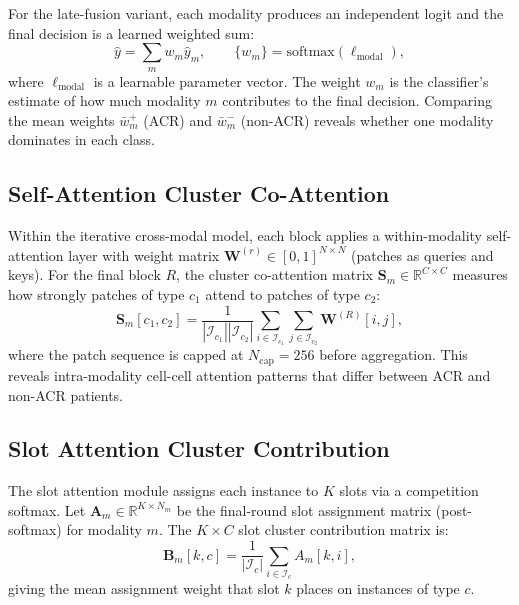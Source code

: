 \documentclass[11pt,a4paper]{article}
\begin{document}
For the late-fusion variant, each modality produces an independent logit and
the final decision is a learned weighted sum:
\begin{equation}
    \hat{y} = \sum_{m} w_m \hat{y}_m,
    \qquad \{w_m\} = \text{softmax}(\boldsymbol{\ell}_\text{modal}),
\end{equation}
where $\boldsymbol{\ell}_\text{modal}$ is a learnable parameter vector.
The weight $w_m$ is the classifier's estimate of how much modality $m$
contributes to the final decision.
Comparing the mean weights $\bar{w}_m^{+}$ (ACR) and $\bar{w}_m^{-}$ (non-ACR)
reveals whether one modality dominates in each class.

\subsection{Self-Attention Cluster Co-Attention}

Within the iterative cross-modal model, each block applies a within-modality
self-attention layer with weight matrix
$\mathbf{W}^{(r)} \in [0,1]^{N\times N}$ (patches as queries and keys).
For the final block $R$, the cluster co-attention matrix
$\mathbf{S}_m \in \mathbb{R}^{C\times C}$ measures how strongly patches of
type $c_1$ attend to patches of type $c_2$:
\begin{equation}
    \mathbf{S}_m[c_1, c_2]
    = \frac{1}{|\mathcal{I}_{c_1}||\mathcal{I}_{c_2}|}
      \sum_{i\in\mathcal{I}_{c_1}}\sum_{j\in\mathcal{I}_{c_2}}
      \mathbf{W}^{(R)}[i,j],
    \label{eq:coattn}
\end{equation}
where the patch sequence is capped at $N_\text{cap}=256$ before aggregation.
This reveals intra-modality cell-cell attention patterns that differ between
ACR and non-ACR patients.

\subsection{Slot Attention Cluster Contribution}

The slot attention module assigns each instance to $K$ slots via a competition
softmax.
Let $\mathbf{A}_m \in \mathbb{R}^{K\times N_m}$ be the final-round slot
assignment matrix (post-softmax) for modality $m$.
The $K\times C$ slot cluster contribution matrix is:
\begin{equation}
    \mathbf{B}_m[k,c]
    = \frac{1}{|\mathcal{I}_c|}\sum_{i\in\mathcal{I}_c} A_m[k,i],
    \label{eq:slot_cluster}
\end{equation}
giving the mean assignment weight that slot $k$ places on instances of type
$c$.
\end{document}
